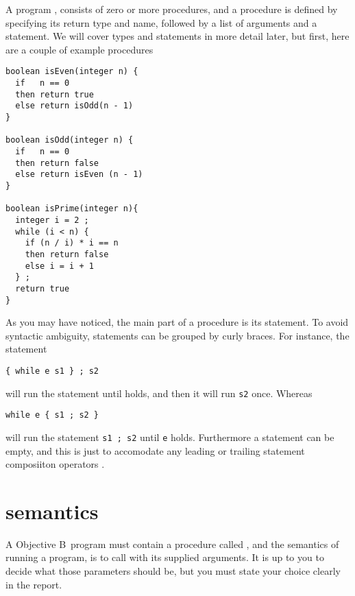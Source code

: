 \documentclass[fleqn,10pt]{olplainarticle}
\def\lang{Objective B}
\begin{document}
A program \prog, consists of zero or more procedures, and a procedure is
defined by specifying its return type and name, followed by a list of
arguments and a statement. We will cover types and statements in more detail
later, but first, here are a couple of example procedures

\begin{verbatim}
boolean isEven(integer n) {
  if   n == 0
  then return true
  else return isOdd(n - 1)
}

boolean isOdd(integer n) {
  if   n == 0
  then return false
  else return isEven (n - 1)
}

boolean isPrime(integer n){
  integer i = 2 ;
  while (i < n) {
    if (n / i) * i == n
    then return false
    else i = i + 1
  } ;
  return true
}
\end{verbatim}

As you may have noticed, the main part of a procedure is its statement.
To avoid syntactic ambiguity, statements can be grouped by curly braces.
For instance, the statement

\begin{verbatim}
{ while e s1 } ; s2
\end{verbatim}

\noindent will run the statement  until  holds, and then it will run
\texttt{s2} once. Whereas

\begin{verbatim}
while e { s1 ; s2 }
\end{verbatim}

\noindent will run the statement \texttt{s1 ; s2} until \texttt{e} holds. Furthermore
a statement can be empty, and this is just to accomodate any leading or
trailing statement composiiton operators .

\section*{semantics}

\def\src{\ensuremath{\pi}}
\def\state{\ensuremath{\sigma}}

\newcommand\runRWS[2]{\ensuremath{\langle #1 \rangle \downarrow \langle #2 \rangle}}
\newcommand\updatesState[3]{\ensuremath{\runRWS{\src, #1, #2}{ #3}}}

\newcommand\eval[2]{\runRWS{\src, \state, #1}{#2}}
\newcommand\lookup[3]{\runRWS{\src, #1, #2}{#3}}

A \lang~program must contain a procedure called , and the
semantics of running a program, is to call  with its supplied
arguments. It is up to you to decide what those parameters should be, but
you must state your choice clearly in the report.
\end{document}
